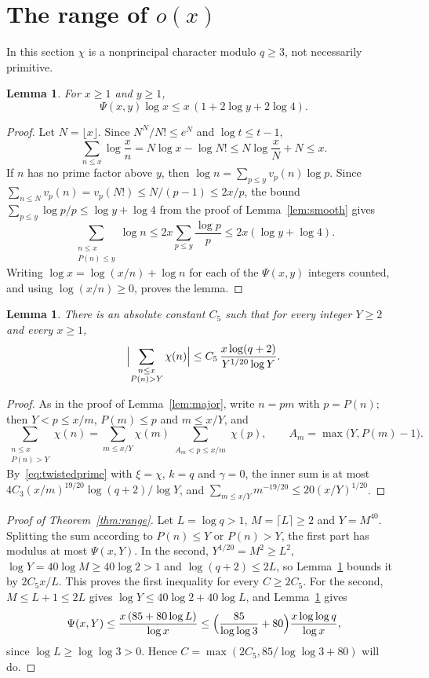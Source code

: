 \documentclass[12pt]{amsart}
\newtheorem{lemma}[theorem]{Lemma}
\theoremstyle{remark}
\begin{document}
\section{The range of \texorpdfstring{$o(x)$}{o(x)}}\label{sec:range}

In this section $\chi$ is a nonprincipal character modulo $q\ge3$, not necessarily primitive.

\begin{lemma}\label{lem:psi}
For $x\ge1$ and $y\ge1$,
\[
  \Psi(x,y)\log x\le x\,(1+2\log y+2\log4).
\]
\end{lemma}

\begin{proof}
Let $N=\lfloor x\rfloor$. Since $N^N/N!\le e^N$ and $\log t\le t-1$,
\[
  \sum_{n\le x}\log\frac xn=N\log x-\log N!\le N\log\frac xN+N\le x .
\]
If $n$ has no prime factor above $y$, then $\log n=\sum_{p\le y}v_p(n)\log p$. Since
$\sum_{n\le N}v_p(n)=v_p(N!)\le N/(p-1)\le2x/p$, the bound
$\sum_{p\le y}\log p/p\le\log y+\log4$ from the proof of Lemma~\ref{lem:smooth} gives
\[
  \sum_{\substack{n\le x\\P(n)\le y}}\log n\le2x\sum_{p\le y}\frac{\log p}p\le2x(\log y+\log4).
\]
Writing $\log x=\log(x/n)+\log n$ for each of the $\Psi(x,y)$ integers counted, and using
$\log(x/n)\ge0$, proves the lemma.
\end{proof}

\begin{lemma}\label{lem:rough}
There is an absolute constant $C_5$ such that for every integer $Y\ge2$ and every $x\ge1$,
\[
  \Bigl|\sum_{\substack{n\le x\\P(n)>Y}}\chi(n)\Bigr|\le C_5\,\frac{x\log(q+2)}{Y^{1/20}\log Y}.
\]
\end{lemma}

\begin{proof}
As in the proof of Lemma~\ref{lem:major}, write $n=pm$ with $p=P(n)$; then $Y<p\le x/m$,
$P(m)\le p$ and $m\le x/Y$, and
\[
  \sum_{\substack{n\le x\\P(n)>Y}}\chi(n)=\sum_{m\le x/Y}\chi(m)\sum_{\substack{A_m<p\le x/m}}\chi(p),
  \qquad A_m=\max\bigl(Y,P(m)-1\bigr).
\]
By~\eqref{eq:twistedprime} with $\xi=\chi$, $k=q$ and $\gamma=0$, the inner sum is at most
$4C_3(x/m)^{19/20}\log(q+2)/\log Y$, and $\sum_{m\le x/Y}m^{-19/20}\le20(x/Y)^{1/20}$.
\end{proof}

\begin{proof}[Proof of Theorem~\ref{thm:range}]
Let $L=\log q>1$, $M=\lceil L\rceil\ge2$ and $Y=M^{40}$. Splitting the sum according to
$P(n)\le Y$ or $P(n)>Y$, the first part has modulus at most $\Psi(x,Y)$. In the second,
$Y^{1/20}=M^2\ge L^2$, $\log Y=40\log M\ge40\log2>1$ and $\log(q+2)\le2L$, so
Lemma~\ref{lem:rough} bounds it by $2C_5x/L$. This proves the first inequality for every
$C\ge2C_5$. For the second, $M\le L+1\le2L$ gives $\log Y\le40\log2+40\log L$, and
Lemma~\ref{lem:psi} gives
\[
  \Psi(x,Y)\le\frac{x\,(85+80\log L)}{\log x}\le\Bigl(\frac{85}{\log\log3}+80\Bigr)\frac{x\log\log q}{\log x},
\]
since $\log L\ge\log\log3>0$. Hence $C=\max(2C_5,85/\log\log3+80)$ will do.
\end{proof}
\end{document}
